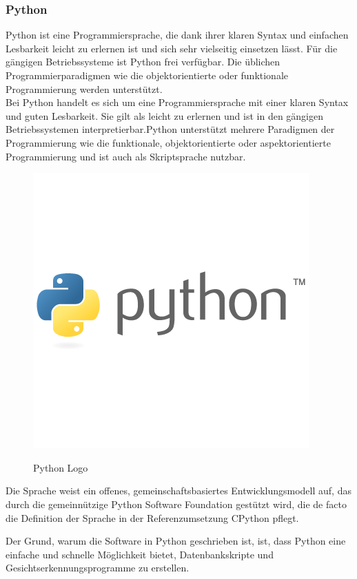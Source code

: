 \subsubsection{Python}
Python ist eine Programmiersprache, die dank ihrer klaren Syntax und einfachen Lesbarkeit leicht zu erlernen ist und sich sehr vielseitig einsetzen lässt. Für die gängigen Betriebssysteme ist Python frei verfügbar. Die üblichen Programmierparadigmen wie die objektorientierte oder funktionale Programmierung werden unterstützt.\\
Bei Python handelt es sich um eine Programmiersprache mit einer klaren Syntax und guten Lesbarkeit. Sie gilt als leicht zu erlernen und ist in den gängigen Betriebssystemen interpretierbar.Python unterstützt mehrere Paradigmen der Programmierung wie die funktionale, objektorientierte oder aspektorientierte Programmierung und ist auch als Skriptsprache nutzbar.\cite{pythonInfo}
\begin{figure}[ht]
	\centering
	\includegraphics[scale=0.3]{./figures/python.png}
	\caption{ Python Logo}
	\label{fig:python}
	\cite{Pythonlogo}
\end{figure}
 Die Sprache weist ein offenes, gemeinschaftsbasiertes Entwicklungsmodell auf, das durch die gemeinnützige Python Software Foundation gestützt wird, die de facto die Definition der Sprache in der Referenzumsetzung CPython pflegt.

\bigbreak
Der Grund, warum die Software in Python geschrieben ist, ist, dass Python eine einfache und schnelle Möglichkeit bietet, Datenbankskripte und Gesichtserkennungsprogramme zu erstellen.
